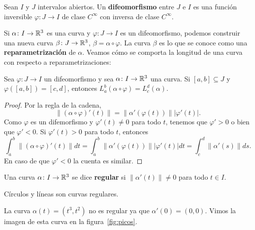 
\begin{definition}
	Sean $I$ y $J$ intervalos abiertos.  Un \textbf{difeomorfismo} entre $J$ e
	$I$ es una función inversible $\varphi\colon J\to I$ de clase $C^{\infty}$
	con inversa de clase $C^{\infty}$.
\end{definition}

Si $\alpha\colon I\to\mathbb{R}^3$ es una curva y $\varphi\colon J\to I$ es un
difeomorfismo, podemos construir una nueva curva $\beta\colon J\to\mathbb{R}^3$,
$\beta=\alpha\circ\varphi$. La curva $\beta$ es lo que se conoce como una
\textbf{reparametrización} de $\alpha$. Veamos cómo se comporta la longitud de
una curva con respecto a reparametrizaciones:

\begin{proposition}
	Sea $\varphi\colon J\to I$ un difeomorfismo y sea $\alpha\colon I\to\mathbb{R}^3$
	una curva. Si $[a,b]\subseteq J$ y $\varphi([a,b])=[c,d]$, entonces
	$L_a^b(\alpha\circ\varphi)=L_c^d(\alpha)$. 
\end{proposition}

\begin{proof}
	Por la regla de la cadena, 
	\[
		\|(\alpha\circ\varphi)'(t)\|=\|\alpha'(\varphi(t))\||\varphi'(t)|.
	\]
	Como $\varphi$ es un difemorfismo y $\varphi'(t)\ne0$ para todo $t$, tenemos que 
	$\varphi'>0$ o bien que $\varphi'<0$. Si $\varphi'(t)>0$ para todo $t$, entonces
	\[
		\int_a^b\|(\alpha\circ\varphi)'(t)\|dt=\int_a^b\|\alpha'(\varphi(t))\||\varphi'(t)|dt=\int_c^d\|\alpha'(s)\|ds.
	\]
	En caso de que $\varphi'<0$ la cuenta es similar. 
\end{proof}


\begin{definition}
	Una curva $\alpha\colon I\to\mathbb{R}^3$ se dice \textbf{regular} si
	$\|\alpha'(t)\|\ne 0$ para todo $t\in I$.
\end{definition}

Círculos y líneas son curvas regulares. 

\begin{example}
	La curva $\alpha(t)=(t^3,t^2)$ no es regular ya que $\alpha'(0)=(0,0)$.
	Vimos la imagen de esta curva en la figura~\ref{fig:picos}.
\end{example}

